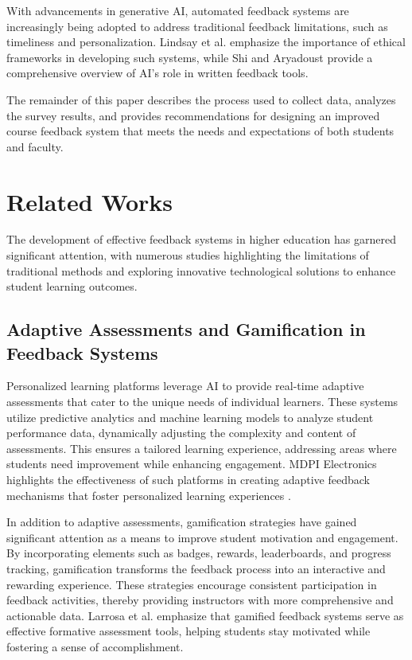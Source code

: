 \documentclass[conference]{IEEEtran}
\begin{document}
With advancements in generative AI, automated feedback systems are increasingly being adopted to address traditional feedback limitations, such as timeliness and personalization. Lindsay et al. \cite{lindsay2024responsibledevelopmentautomatedstudent} emphasize the importance of ethical frameworks in developing such systems, while Shi and Aryadoust \cite{Shi_Aryadoust_2024} provide a comprehensive overview of AI's role in written feedback tools.

The remainder of this paper describes the process used to collect data, analyzes the survey results, and provides recommendations for designing an improved course feedback system that meets the needs and expectations of both students and faculty.



\section{Related Works}

The development of effective feedback systems in higher education has garnered significant attention, with numerous studies highlighting the limitations of traditional methods and exploring innovative technological solutions to enhance student learning outcomes.

\subsection{Adaptive Assessments and Gamification in Feedback Systems}

Personalized learning platforms leverage AI to provide real-time adaptive assessments that cater to the unique needs of individual learners. These systems utilize predictive analytics and machine learning models to analyze student performance data, dynamically adjusting the complexity and content of assessments. This ensures a tailored learning experience, addressing areas where students need improvement while enhancing engagement. MDPI Electronics highlights the effectiveness of such platforms in creating adaptive feedback mechanisms that foster personalized learning experiences \cite{mdpi2024personalized}.

In addition to adaptive assessments, gamification strategies have gained significant attention as a means to improve student motivation and engagement. By incorporating elements such as badges, rewards, leaderboards, and progress tracking, gamification transforms the feedback process into an interactive and rewarding experience. These strategies encourage consistent participation in feedback activities, thereby providing instructors with more comprehensive and actionable data. Larrosa et al. \cite{electronics13183762} emphasize that gamified feedback systems serve as effective formative assessment tools, helping students stay motivated while fostering a sense of accomplishment.
\end{document}
